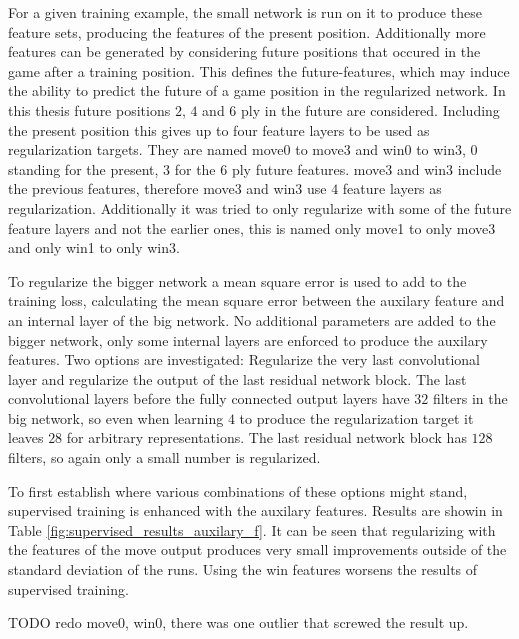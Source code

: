 \documentclass[12pt,onecolumn,oneside,titlepage]{article}
\begin{document}
For a given training example, the small network is run on it to produce these feature sets, producing the features of the present position. Additionally more features can be generated by considering future positions that occured in the game
after a training position. This defines the future-features, which may induce the ability to predict the future of a game position in the regularized network. In this thesis future positions $2$, $4$ and $6$ ply in the future are considered.
Including the present position this gives up to four feature layers to be used as regularization targets. They are named move0 to move3 and win0 to win3, $0$ standing for the present, $3$ for the $6$ ply future features. move3 and win3 include the previous features,
therefore move3 and win3 use $4$ feature layers as regularization. Additionally it was tried to only regularize with some of the future feature layers and not the earlier ones, this is named only move1 to only move3 and only win1 to only win3.

To regularize the bigger network a mean square error is used to add to the training loss, calculating the mean square error between the auxilary feature and an internal layer of the big network. No additional parameters are added to the bigger network,
only some internal layers are enforced to produce the auxilary features. Two options are investigated: Regularize the very last convolutional layer and regularize the output of the last residual network block. The last convolutional layers before
the fully connected output layers have $32$ filters in the big network, so even when learning $4$ to produce the regularization target it leaves $28$ for arbitrary representations. The last residual network block has $128$ filters, so again only a small number is regularized.

To first establish where various combinations of these options might stand, supervised training is enhanced with the auxilary features. Results are showin in Table \ref {fig:supervised_results_auxilary_f}. It can be seen that regularizing with the features of the
move output produces very small improvements outside of the standard deviation of the runs. Using the win features worsens the results of supervised training.

TODO redo move0, win0, there was one outlier that screwed the result up.
\end{document}
